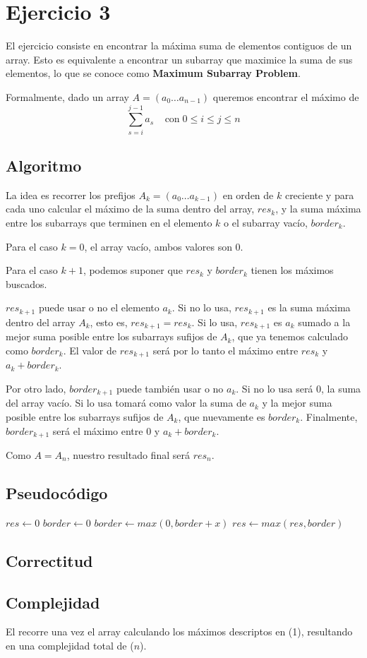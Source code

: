 \section{Ejercicio 3}

El ejercicio consiste en encontrar la máxima suma de elementos contiguos de un array.
Esto es equivalente a encontrar un subarray que maximice la suma de sus elementos,
lo que se conoce como \textbf{Maximum Subarray Problem}.


Formalmente, dado un array $A = (a_0 \ldots a_{n-1})$ queremos encontrar el máximo de
$$
\sum_{s=i}^{j-1} a_s \;\;\;\; \text{con} \; 0 \leq i \leq j \leq n
$$


\subsection{Algoritmo}

La idea es recorrer los prefijos $A_k = (a_0 \ldots a_{k-1})$ en orden de $k$ creciente
y para cada uno calcular el máximo de la suma dentro del array, $res_k$,
y la suma máxima entre los subarrays que terminen en el elemento $k$ o el subarray vacío, $border_k$.

Para el caso $k=0$, el array vacío, ambos valores son 0.

Para el caso $k+1$, podemos suponer que $res_k$ y $border_k$ tienen los máximos buscados.

$res_{k+1}$ puede usar o no el elemento $a_k$. Si no lo usa, $res_{k+1}$ es la suma máxima dentro del array $A_k$, esto es, $res_{k+1} = res_k$. Si lo usa, $res_{k+1}$ es $a_k$ sumado a la mejor suma posible entre los subarrays sufijos de $A_k$, que ya tenemos calculado como $border_k$. El valor de $res_{k+1}$ será por lo tanto el máximo entre $res_k$ y $a_k + border_k$.

Por otro lado, $border_{k+1}$ puede también usar o no $a_k$. Si no lo usa será $0$, la suma del array vacío. Si lo usa tomará como valor la suma de $a_k$ y la mejor suma posible entre los subarrays sufijos de $A_k$, que nuevamente es $border_k$. Finalmente, $border_{k+1}$ será el máximo entre $0$ y $a_k + border_k$.

Como $A = A_n$, nuestro resultado final será $res_n$.

\subsection{Pseudocódigo}

\begin{algorithmic}

    \State $res \gets 0$
    \State $border \gets 0$
        \State $border \gets max(0, border+x)$
        \State $res \gets max(res, border)$
    \EndFor
    \State {}
\EndFunction

\end{algorithmic}

\subsection{Correctitud}

\subsection{Complejidad}

El recorre una vez el array calculando los máximos descriptos en \bigo(1), resultando en una complejidad total de \bigo($n$).

